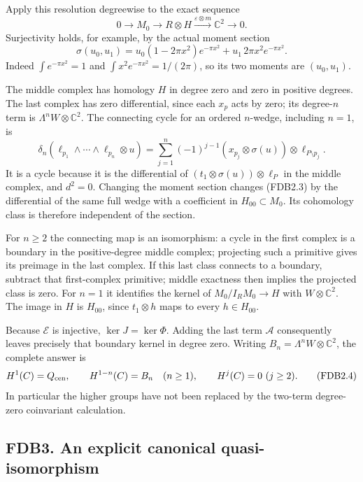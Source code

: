 Apply this resolution degreewise to the exact sequence \[
0\longrightarrow M_0\longrightarrow R\otimes H
\xrightarrow{\varepsilon\otimes m}\mathbb C^2\longrightarrow0.
\tag{FDB2.1}
\] Surjectivity holds, for example, by the actual moment section \[
\sigma(u_0,u_1)=u_0(1-2\pi x^2)e^{-\pi x^2}
+u_1\,2\pi x^2e^{-\pi x^2}.
\tag{FDB2.2}
\] Indeed \(\int e^{-\pi x^2}=1\) and \(\int x^2e^{-\pi x^2}=1/(2\pi)\),
so its two moments are \((u_0,u_1)\).

The middle complex has homology \(H\) in degree zero and zero in
positive degrees. The last complex has zero differential, since each
\(x_p\) acts by zero; its degree-\(n\) term is
\(\Lambda^nW\otimes\mathbb C^2\). The connecting cycle for an ordered
\(n\)-wedge, including \(n=1\), is \[
\delta_n(\ell_{p_1}\wedge\cdots\wedge\ell_{p_n}\otimes u)
=\sum_{j=1}^n(-1)^{j-1}
(x_{p_j}\otimes\sigma(u))\otimes\ell_{P\setminus p_j}.
\tag{FDB2.3}
\] It is a cycle because it is the differential of
\((t_1\otimes\sigma(u))\otimes\ell_P\) in the middle complex, and
\(d^2=0\). Changing the moment section changes (FDB2.3) by the
differential of the same full wedge with a coefficient in
\(H_{00}\subset M_0\). Its cohomology class is therefore independent of
the section.

For \(n\ge2\) the connecting map is an isomorphism: a cycle in the first
complex is a boundary in the positive-degree middle complex; projecting
such a primitive gives its preimage in the last complex. If this last
class connects to a boundary, subtract that first-complex primitive;
middle exactness then implies the projected class is zero. For \(n=1\)
it identifies the kernel of \(M_0/I_RM_0\to H\) with
\(W\otimes\mathbb C^2\). The image in \(H\) is \(H_{00}\), since
\(t_1\otimes h\) maps to every \(h\in H_{00}\).

Because \(\mathcal E\) is injective, \(\ker J=\ker\Phi\). Adding the
last term \(\mathcal A\) consequently leaves precisely that boundary
kernel in degree zero. Writing \(B_n=\Lambda^nW\otimes\mathbb C^2\), the
complete answer is \[
H^1(C)=Q_{\rm cen},\qquad
H^{1-n}(C)=B_n\quad(n\ge1),\qquad H^j(C)=0\ (j\ge2).
\tag{FDB2.4}
\] In particular the higher groups have not been replaced by the
two-term degree-zero coinvariant calculation.

\subsection{FDB3. An explicit canonical
quasi-isomorphism}\label{fdb3.-an-explicit-canonical-quasi-isomorphism}

